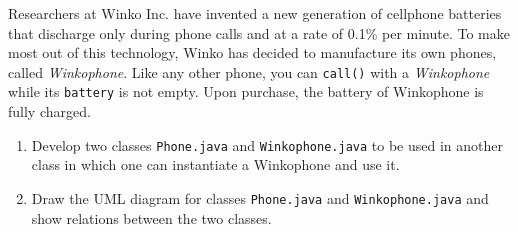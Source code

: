 Researchers at Winko Inc. have invented a new generation of cellphone batteries that discharge only during phone calls and at a rate of 0.1\% per minute. To make most out of this technology, Winko has decided to manufacture its own phones, called \textit{Winkophone}. Like any other phone, you can \texttt{call()} with a \textit{Winkophone} while its \texttt{battery} is not empty. Upon purchase, the battery of Winkophone is fully charged.

\begin{enumerate}[label=(\alph*)]
\item Develop two classes \texttt{Phone.java} and \texttt{Winkophone.java} to be used in another class in which one can instantiate a Winkophone and use it.
\item Draw the UML diagram for classes \texttt{Phone.java} and \texttt{Winkophone.java} and show relations between the two classes.
\end{enumerate}
